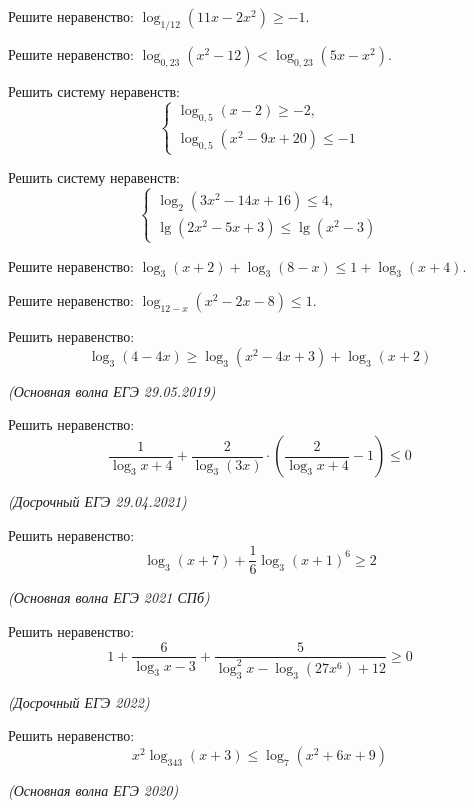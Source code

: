 \begin{class}[number=8]
	\begin{listofex}
		\item Решите неравенство: \( \log_{1/12}(11x-2x^2)\ge-1 \).
		\item Решите неравенство: \( \log_{0,23}(x^2-12)<\log_{0,23}(5x-x^2) \).
		\item Решить систему неравенств:
		\[ \begin{cases}
			\log_{0,5}(x-2)\ge-2,\\
			\log_{0,5}(x^2-9x+20)\le-1
		\end{cases} \]
		\item Решить систему неравенств:
		\[ \begin{cases}
			\log_{2}(3x^2-14x+16)\le4,\\
			\lg(2x^2-5x+3)\le\lg(x^2-3)
		\end{cases} \]
		\item Решите неравенство: \( \log_3(x+2)+\log_3(8-x)\le1+\log_3(x+4) \).
		\item Решите неравенство: \( \log_{12-x}(x^2-2x-8)\le1 \).
		\item Решить неравенство:
		\[ \log_3(4-4x)\ge\log_3(x^2-4x+3)+\log_3(x+2) \]
		\begin{flushright}
			\textit{(Основная волна ЕГЭ 29.05.2019)}
		\end{flushright}
		\item Решить неравенство:
		\[ \dfrac{1}{\log_3x+4}+\dfrac{2}{\log_3(3x)}\cdot\left( \dfrac{2}{\log_3x+4}-1 \right)\le0 \]
		\begin{flushright}
			\textit{(Досрочный ЕГЭ 29.04.2021)}
		\end{flushright}
		\item Решить неравенство:
		\[ \log_3(x+7)+\dfrac{1}{6}\log_3(x+1)^6\ge2 \]
		\begin{flushright}
			\textit{(Основная волна ЕГЭ 2021 СПб)}
		\end{flushright}
		\newpage
		\item Решить неравенство:
		\[ 1+\dfrac{6}{\log_3x-3}+\dfrac{5}{\log^2_3x-\log_3(27x^6)+12}\ge0 \]
		\begin{flushright}
			\textit{(Досрочный ЕГЭ 2022)}
		\end{flushright}
		\item Решить неравенство:
		\[ x^2\log_{343}(x+3)\le\log_7(x^2+6x+9) \]
		\begin{flushright}
			\textit{(Основная волна ЕГЭ 2020)}
		\end{flushright}
	\end{listofex}
\end{class}

